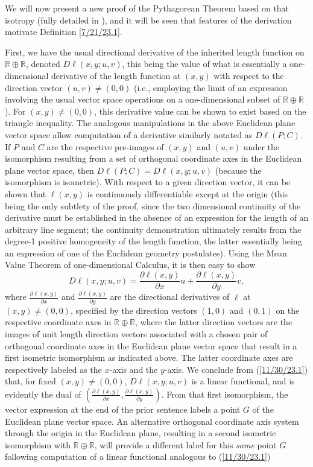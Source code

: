 \documentclass{amsart}
\numberwithin{equation}{section}
\theoremstyle{definition}
\numberwithin{theorem}{section}
\begin{document}
 We will now present a new proof of the Pythagorean Theorem based on that isotropy (fully detailed in \cite{fgreensite:2022b}), and it will be seen that features of the derivation motivate Definition \ref{7/21/23.1}.
 
 First,  we have the usual directional derivative of the inherited length function on $\mathbb{R}\oplus\mathbb{R}$, denoted $D\ell(x,y;u,v)$, this being the value of what is essentially a one-dimensional derivative of the length function at $(x,y)$ with respect to the direction vector $(u,v)\ne (0,0)$ (i.e., employing the limit of an expression involving the usual vector space operations on a one-dimensional subset of $\mathbb{R}\oplus\mathbb{R}$).  For $(x,y)\ne (0,0)$, this derivative value can be shown to exist based on the triangle inequality. The analogous manipulations in the above Euclidean plane vector space allow computation of a derivative similarly notated as $D\ell(P;C)$.  If $P$ and $C$ are the respective pre-images of $(x,y)$ and $(u,v)$ under the isomorphism resulting from a set of orthogonal coordinate axes in the Euclidean plane vector space, then $D\ell(P;C) = D\ell(x,y;u,v)$ (because the isomorphism is isometric).  With respect to a given direction vector, it can be shown that $\ell(x,y)$ is continuously differentiable except at the origin (this being the only subtlety of the proof, since the two dimensional continuity of the derivative must be established in the absence of an expression for the length of an arbitrary line segment; the continuity demonstration ultimately results from the degree-1 positive homogeneity of the length function, the latter essentially being an expression of one of the Euclidean geometry postulates).  Using the Mean Value Theorem of one-dimensional Calculus, it is then easy to show \begin{equation}\label{11/30/23.1} D\ell(x,y;u,v) = \frac{\partial \ell(x,y)}{\partial x}u + \frac{\partial \ell(x,y)}{\partial y}v,\end{equation} where $\frac{\partial \ell(x,y)}{\partial x}$ and $\frac{\partial \ell(x,y)}{\partial y}$ are the directional derivatives of $\ell$ at $(x,y)\ne(0,0)$, specified by the direction vectors $(1,0)$ and $(0,1)$ on the respective coordinate axes in $\mathbb{R}\oplus\mathbb{R}$, where the latter direction vectors are the images of unit length direction vectors associated with a chosen pair of orthogonal coordinate axes in the Euclidean plane vector space that result in a first isometric isomorphism as indicated above.  The latter coordinate axes are respectively labeled as the $x$-axis and the $y$-axis. We conclude from (\ref{11/30/23.1}) that, for fixed $(x,y)\ne (0,0)$,  $D\ell(x,y;u,v)$ is a linear functional, and is evidently the dual of $\left(\frac{\partial\ell(x,y)}{\partial x}, \frac{\partial\ell(x,y)}{\partial y}\right)$.  From that first isomorphism, the vector expression at the end of the prior sentence labels a point $G$ of the Euclidean plane vector space.  An alternative orthogonal coordinate axis system through the origin in the Euclidean plane, resulting in a second isometric isomorphism with $\mathbb{R}\oplus\mathbb{R}$, will provide a different label for this {\it same} point $G$ following computation of a linear functional analogous to (\ref{11/30/23.1}) 
\end{document}
